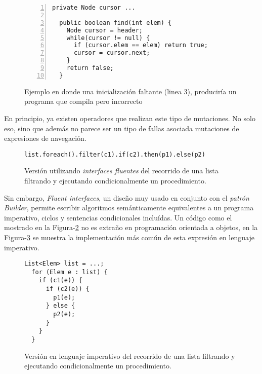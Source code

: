 \begin{figure}
	\begin{lstlisting}[frame=single, numbers=left, mathescape=true,framexleftmargin=1.5em]
  private Node cursor ...
	
  public boolean find(int elem) {
    Node cursor = header;
    while(cursor != null) {
      if (cursor.elem == elem) return true;
      cursor = cursor.next;
    }
    return false;
  }
	\end{lstlisting}
	\caption{Ejemplo en donde una inicializaci\'on faltante (linea 3), producir\'ia un programa que compila pero incorrecto}
	\label{figures.examples.localVariableHidingField}
\end{figure}

En principio, ya existen operadores que realizan este tipo de mutaciones. No solo eso, sino que adem\'as no parece ser un tipo de fallas asociada mutaciones de expresiones de navegaci\'on.

\begin{figure}
	\begin{lstlisting}[frame=single, mathescape=true,framexleftmargin=1.5em]
  list.foreach().filter(c1).if(c2).then(p1).else(p2)
	\end{lstlisting}
	\caption{Versi\'on utilizando \emph{interfaces fluentes} del recorrido de una lista filtrando y ejecutando condicionalmente un procedimiento.}
	\label{figures.examples.fluent.example1.fluent}
\end{figure}

Sin embargo, \emph{Fluent interfaces}, un dise\~no muy usado en conjunto con el \emph{patr\'on Builder}, permite escribir algoritmos sem\'anticamente equivalentes a un programa imperativo, ciclos y sentencias condicionales inclu\'idas. Un c\'odigo como el mostrado en la Figura-\ref{figures.examples.fluent.example1.fluent} no es extra\~no en programaci\'on orientada a objetos, en la Figura-\ref{figures.examples.fluent.example1.imperative} se muestra la implementaci\'on m\'as com\'un de esta expresi\'on en lenguaje imperativo.

\begin{figure}
	\begin{lstlisting}[frame=single, mathescape=true,framexleftmargin=1.5em]
  List<Elem> list = ...;
  for (Elem e : list) {
    if (c1(e)) {
      if (c2(e)) {
        p1(e);
      } else {
        p2(e);
      }
    }
  }
	\end{lstlisting}
	\caption{Versi\'on en lenguaje imperativo del recorrido de una lista filtrando y ejecutando condicionalmente un procedimiento.}
	\label{figures.examples.fluent.example1.imperative}
\end{figure}

